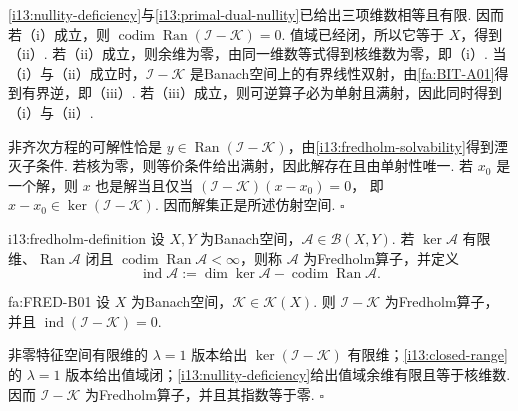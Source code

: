 \begin{FAProof}
\autoref{i13:nullity-deficiency}与\autoref{i13:primal-dual-nullity}已给出三项维数相等且有限. 因而若（i）成立，则 \(\displaystyle \operatorname{codim}\operatorname{Ran}(\mathcal I-\mathcal K)=0\). 值域已经闭，所以它等于 \(\displaystyle X\)，得到（ii）. 若（ii）成立，则余维为零，由同一维数等式得到核维数为零，即（i）. 当（i）与（ii）成立时，\(\displaystyle \mathcal I-\mathcal K\) 是Banach空间上的有界线性双射，由\autoref{fa:BIT-A01}得到有界逆，即（iii）. 若（iii）成立，则可逆算子必为单射且满射，因此同时得到（i）与（ii）.

非齐次方程的可解性恰是 \(\displaystyle y\in\operatorname{Ran}(\mathcal I-\mathcal K)\)，由\autoref{i13:fredholm-solvability}得到湮灭子条件. 若核为零，则等价条件给出满射，因此解存在且由单射性唯一. 若 \(\displaystyle x_0\) 是一个解，则 \(\displaystyle x\) 也是解当且仅当
\(\displaystyle (\mathcal I-\mathcal K)(x-x_0)=0\)，
即 \(\displaystyle x-x_0\in\ker(\mathcal I-\mathcal K)\). 因而解集正是所述仿射空间.
\hfill\(\square\)
\end{FAProof}

\begin{FADefinition}[B][Fredholm算子与指数]{i13:fredholm-definition}
设 \(\displaystyle X,Y\) 为Banach空间，\(\displaystyle \mathcal A\in\mathcal B(X,Y)\). 若 \(\displaystyle \ker\mathcal A\) 有限维、\(\displaystyle \operatorname{Ran}\mathcal A\) 闭且 \(\displaystyle \operatorname{codim}\operatorname{Ran}\mathcal A<\infty\)，则称 \(\displaystyle \mathcal A\) 为Fredholm算子，并定义
\[
\operatorname{ind}\mathcal A
:=
\dim\ker\mathcal A
-
\operatorname{codim}\operatorname{Ran}\mathcal A.
\]
\end{FADefinition}

\begin{FATheorem}[B][恒等减紧算子的Fredholm指数]{fa:FRED-B01}
设 \(\displaystyle X\) 为Banach空间，\(\displaystyle \mathcal K\in\mathcal K(X)\). 则 \(\displaystyle \mathcal I-\mathcal K\) 为Fredholm算子，并且
\(\displaystyle \operatorname{ind}(\mathcal I-\mathcal K) =0\).
\end{FATheorem}

\begin{FAProof}
非零特征空间有限维的 \(\displaystyle \lambda=1\) 版本给出 \(\displaystyle \ker(\mathcal I-\mathcal K)\) 有限维；\autoref{i13:closed-range}的 \(\displaystyle \lambda=1\) 版本给出值域闭；\autoref{i13:nullity-deficiency}给出值域余维有限且等于核维数. 因而 \(\displaystyle \mathcal I-\mathcal K\) 为Fredholm算子，并且其指数等于零.
\hfill\(\square\)
\end{FAProof}

